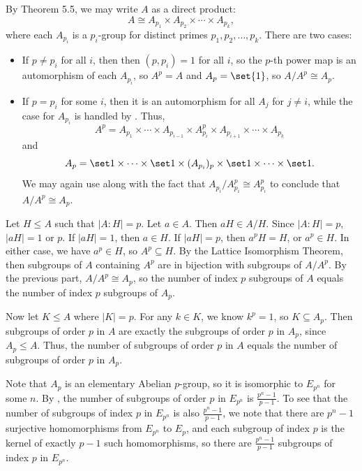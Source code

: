 \begin{solenum}
    \item By Theorem 5.5, we may write $A$ as a direct product:
    \[
    	A \cong A_{p_1} \times A_{p_2} \times \cdots \times A_{p_k},
    \]
    where each $A_{p_i}$ is a $p_i$-group for distinct primes $p_1, p_2, \ldots, p_k$.
	There are two cases:
    \begin{itemize}
        \item If $p \neq p_i$ for all $i$, then then $(p, p_i) = 1$ for all $i$, so the $p$-th power map is an automorphism of each $A_{p_i}$, so $A^p = A$ and $A_p = \set{1}$, so $A/A^p \cong A_p$.
        \item If $p = p_i$ for some $i$, then it is an automorphism for all $A_j$ for $j \neq i$, while the case for $A_{p_i}$ is handled by .
	Thus,
        \[
        	A^p = A_{p_1} \times \cdots \times A_{p_{i-1}} \times A_{p_i}^p \times A_{p_{i+1}} \times \cdots \times A_{p_k}
        \]
        and
        \[
        	A_p = \set 1 \times \cdots \times \set 1 \times (A_{p_i})_p \times \set 1 \times \cdots \times \set 1.
        \]
        We may again use  along with the fact that $A_{p_i} / A_{p_i}^p \cong A_{p_i}^p$ to conclude that $A/A^p \cong A_p$.
    \end{itemize}
    \item Let $H \leq A$ such that $|A : H| = p$.
	Let $a \in A$.
	Then $aH \in A/H$.
	Since $|A : H| = p$, $|aH| = 1$ or $p$.
	If $|aH| = 1$, then $a \in H$.
	If $|aH| = p$, then $a^pH = H$, or $a^p \in H$.
	In either case, we have $a^p \in H$, so $A^p \subseteq H$.
	By the Lattice Isomorphism Theorem, then subgroups of $A$ containing $A^p$ are in bijection with subgroups of $A/A^p$.
	By the previous part, $A/A^p \cong A_p$, so the number of index $p$ subgroups of $A$ equals the number of index $p$ subgroups of $A_p$.
    
    Now let $K \leq A$ where $|K| = p$.
	For any $k \in K$, we know $k^p = 1$, so $K \subseteq A_p$.
	Then subgroups of order $p$ in $A$ are exactly the subgroups of order $p$ in $A_p$, since $A_p \leq A$.
	Thus, the number of subgroups of order $p$ in $A$ equals the number of subgroups of order $p$ in $A_p$.

    Note that $A_p$ is an elementary Abelian $p$-group, so it is isomorphic to $E_{p^n}$ for some $n$.
	By , the number of subgroups of order $p$ in $E_{p^n}$ is $\frac{p^n - 1}{p - 1}$.
	To see that the number of subgroups of index $p$ in $E_{p^n}$ is also $\frac{p^n - 1}{p - 1}$, we note that there are $p^n - 1$ surjective homomorphisms from $E_{p^n}$ to $E_p$, and each subgroup of index $p$ is the kernel of exactly $p - 1$ such homomorphisms, so there are $\frac{p^n - 1}{p - 1}$ subgroups of index $p$ in $E_{p^n}$.
\end{solenum}

